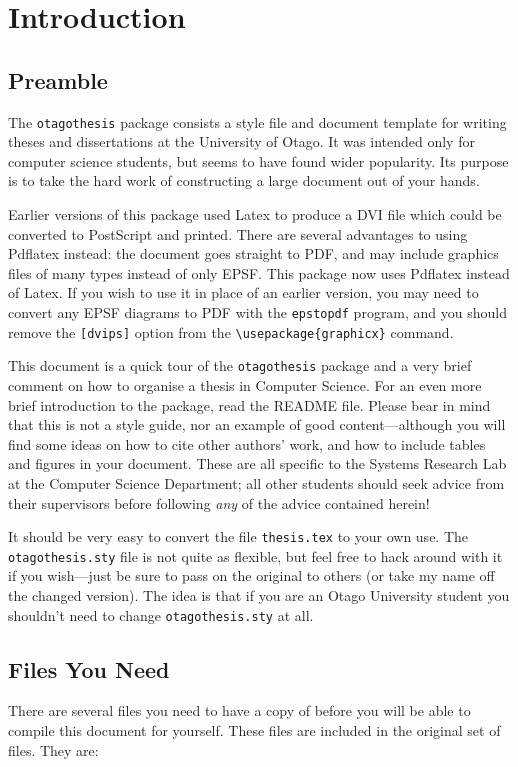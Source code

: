 \chapter{Introduction}

\section{Preamble}

The {\tt otagothesis} package consists a style file and document
template for writing theses and dissertations at the University of
Otago.  It was intended only for computer science students, but seems
to have found wider popularity.  Its purpose is to take the hard work
of constructing a large document out of your hands.

Earlier versions of this package used Latex to produce a DVI file
which could be converted to PostScript and printed.  There are several
advantages to using Pdflatex instead: the document goes straight to
PDF, and may include graphics files of many types instead of only
EPSF.  This package now uses Pdflatex instead of Latex.  If you wish
to use it in place of an earlier version, you may need to convert any
EPSF diagrams to PDF with the \verb|epstopdf| program, and you should
remove the \verb|[dvips]| option from the \verb|\usepackage{graphicx}|
command.

This document is a quick tour of the {\tt otagothesis} package and a
very brief comment on how to organise a thesis in Computer Science.
For an even more brief introduction to the package, read the README
file.  Please bear in mind that this is not a style guide, nor an
example of good content---although you will find some ideas on how
to cite other authors' work, and how to include tables and figures in
your document.  These are all specific to the Systems Research Lab at
the Computer Science Department; all other students should seek advice
from their supervisors before following {\em any} of the advice
contained herein!

It should be very easy to convert the file {\tt thesis.tex} to
your own use.
The {\tt otagothesis.sty} file is not quite as flexible, but feel
free to hack around with it if you wish---just be sure to pass on
the original to others (or take my name off the changed version).
The idea is that if you are an Otago University student
you shouldn't need to change {\tt otagothesis.sty} at all.

\section{Files You Need}
\label{sec:files}
There are several files you need to have a copy of before you will be
able to compile this document for yourself. These files are included in the original set of files. They are:

